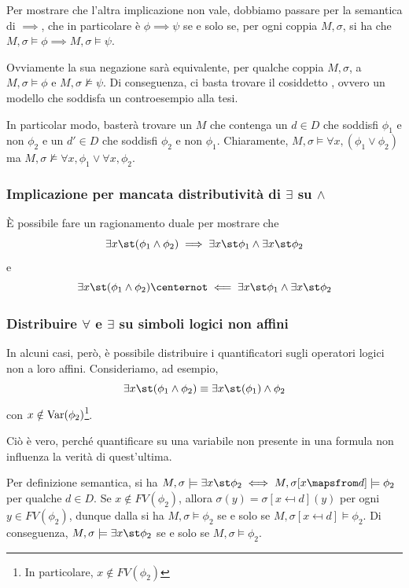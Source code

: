 Per mostrare che l'altra implicazione non vale, dobbiamo passare per la semantica di \(\implies\), che in particolare è \(\phi \implies\psi\) se e solo se, per ogni coppia \(M, \sigma\), si ha che \(M,\sigma\models \phi \implies M,\sigma\models \psi\). 

Ovviamente la sua negazione sarà equivalente, per qualche coppia \(M, \sigma\), a \(M,\sigma\models \phi\) e \(M,\sigma\not\models \psi\). Di conseguenza, ci basta trovare il cosiddetto , ovvero un modello che soddisfa un controesempio alla tesi. 

In particolar modo, basterà trovare un \(M\) che contenga un \(d \in D\) che soddisfi \(\phi_1\) e non \(\phi_2\) e un \(d' \in D\) che soddisfi \(\phi_2\) e non \(\phi_1\). Chiaramente, \(M,\sigma\models \forall x, (\phi_1 \lor \phi_2)\) ma \(M,\sigma\not\models \forall x, \phi_1 \lor \forall x, \phi_2\).


\subsubsection{Implicazione per mancata distributività di \(\exists\) su \(\land\)}
È possibile fare un ragionamento duale per mostrare che 
\[\exists x\st( \phi_1 \land \phi_2) \implies \exists x\st \phi_1 \land \exists x\st \phi_2\]
e
\[\exists x\st (\phi_1 \land \phi_2 )\centernot\impliedby \exists x\st \phi_1 \land \exists x\st \phi_2\]

\subsubsection{Distribuire \(\forall\) e \(\exists\) su simboli logici non affini}
In alcuni casi, però, è possibile distribuire i quantificatori sugli operatori logici non a loro affini. Consideriamo, ad esempio,
\[\exists x\st(\phi_1 \land \phi_2) \equiv \exists x\st( \phi_1) \land \phi_2\]
con \(x \notin \operatorname{Var}(\phi_2)\)\footnote{In particolare, \(x \notin FV(\phi_2)\)}.

Ciò è vero, perché quantificare su una variabile non presente in una formula non influenza la verità di quest'ultima.

Per definizione semantica, si ha \(M,\sigma \models \exists x\st\phi_2 \iff M,\sigma[x\mapsfrom d] \models \phi_2 \) per qualche \(d\in D\). Se \(x \notin FV(\phi_2)\), allora \(\sigma(y)=\sigma[x\mapsfrom d](y)\) per ogni \(y \in FV(\phi_2)\), dunque dalla  si ha \(M,\sigma \models \phi_2\) se e solo se \(M,\sigma[x\mapsfrom d] \models \phi_2\). Di conseguenza, \(M,\sigma \models \exists x\st\phi_2\) se e solo se \(M,\sigma \models \phi_2\).


